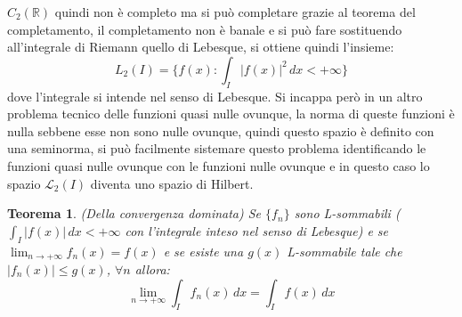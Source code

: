 \documentclass[12pt]{book}
\theoremstyle{plain}
\newcommand{\R}{\mathbb{R}}
\newtheorem{thm}{Teorema}[section]
\theoremstyle{definition}
\theoremstyle{remark}
\begin{document}
$C_2(\R)$ quindi non è completo ma si può completare grazie al teorema del completamento, il completamento non è banale e si può fare sostituendo all'integrale di Riemann quello di Lebesque, si ottiene quindi l'insieme:
\[L_2(I) = \{f(x):\int_I|f(x)|^2\,dx<+\infty\} \]
dove l'integrale si intende nel senso di Lebesque. Si incappa però in un altro problema tecnico delle funzioni quasi nulle ovunque, la norma di queste funzioni è nulla sebbene esse non sono nulle ovunque, quindi questo spazio è definito con una seminorma, si può facilmente sistemare questo problema identificando le funzioni quasi nulle ovunque con le funzioni nulle ovunque e in questo caso lo spazio $\mathcal{L}_2(I)$ diventa uno spazio di Hilbert.
\begin{thm}(Della convergenza dominata)
Se $\{f_n\}$ sono L-sommabili ($\int_I|f(x)|\,dx<+\infty$ con l'integrale inteso nel senso di Lebesque) e se $\displaystyle\lim_{n\to+\infty} f_n(x) = f(x)$ e se esiste una $g(x)$ L-sommabile tale che $|f_n(x)|\leq g(x)$, $\forall n$ allora:
\[\lim_{n\to+\infty} \int_I f_n(x)\,dx = \int_I f(x)\,dx\]
\end{thm}
\end{document}
